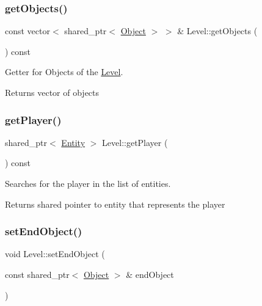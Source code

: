 \subsubsection{\texorpdfstring{get\+Objects()}{getObjects()}}
{\footnotesize\ttfamily const vector$<$ shared\+\_\+ptr$<$ \hyperlink{classObject}{Object} $>$ $>$ \& Level\+::get\+Objects (\begin{DoxyParamCaption}{ }\end{DoxyParamCaption}) const}



Getter for Objects of the \hyperlink{classLevel}{Level}. 

\begin{DoxyReturn}{Returns}
vector of objects 
\end{DoxyReturn}
\mbox{\label{classLevel_ad8047f23492bae60e0b7305e7efff0c1}} 
\subsubsection{\texorpdfstring{get\+Player()}{getPlayer()}}
{\footnotesize\ttfamily shared\+\_\+ptr$<$ \hyperlink{classEntity}{Entity} $>$ Level\+::get\+Player (\begin{DoxyParamCaption}{ }\end{DoxyParamCaption}) const}



Searches for the player in the list of entities. 

\begin{DoxyReturn}{Returns}
shared pointer to entity that represents the player 
\end{DoxyReturn}
\mbox{\label{classLevel_a74205a71e7c437a989666af24435bf67}} 
\subsubsection{\texorpdfstring{set\+End\+Object()}{setEndObject()}}
{\footnotesize\ttfamily void Level\+::set\+End\+Object (\begin{DoxyParamCaption}\item[{const shared\+\_\+ptr$<$ \hyperlink{classObject}{Object} $>$ \&}]{end\+Object }\end{DoxyParamCaption})}



